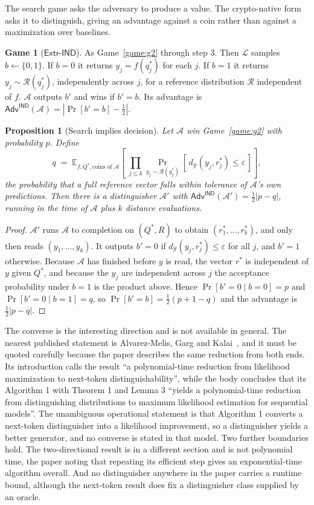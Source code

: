 \documentclass[11pt]{article}
\theoremstyle{definition}
\newtheorem{game}{Game}
\theoremstyle{plain}
\newtheorem{proposition}{Proposition}
\newcommand{\Adv}{\mathsf{Adv}}
\newcommand{\A}{\mathcal{A}}
\newcommand{\Lrn}{\mathcal{L}}
\newcommand{\Y}{\mathcal{Y}}
\begin{document}
The search game asks the adversary to produce a value. The crypto-native form asks
it to distinguish, giving an advantage against a coin rather than against a
maximization over baselines.

\begin{game}[$\mathsf{Extr}\text{-}\mathsf{IND}$]
\label{game:ind}
As Game~\ref{game:g2} through step 3. Then $\Lrn$ samples $b \leftarrow \{0,1\}$.
If $b = 0$ it returns $y_j = f(q^*_j)$ for each $j$. If $b = 1$ it returns
$y_j \sim \mathcal{R}(q^*_j)$, independently across $j$, for a reference
distribution $\mathcal{R}$ independent of $f$. $\A$ outputs $b'$ and wins if
$b' = b$. Its advantage is $\Adv^{\mathsf{IND}}(\A) = |\Pr[b'=b] - \tfrac12|$.
\end{game}

\begin{proposition}[Search implies decision]
\label{prop:s2d}
Let $\A$ win Game~\ref{game:g2} with probability $p$. Define
\[
q \;=\; \mathbb{E}_{f, Q^*, \text{coins of } \A}
\left[\; \prod_{j \le k}
\Pr_{y_j \sim \mathcal{R}(q^*_j)}\!\left[\, d_\Y(y_j, r^*_j) \le \varepsilon \,\right]
\right],
\]
the probability that a full reference vector falls within tolerance of $\A$'s own
predictions. Then there is a distinguisher $\A'$ with
$\Adv^{\mathsf{IND}}(\A') = \tfrac12|p - q|$, running in the time of $\A$ plus $k$
distance evaluations.
\end{proposition}

\begin{proof}
$\A'$ runs $\A$ to completion on $(Q^*, R)$ to obtain $(r^*_1,\dots,r^*_k)$, and
only then reads $(y_1,\dots,y_k)$. It outputs $b'=0$ if $d_\Y(y_j, r^*_j) \le
\varepsilon$ for all $j$, and $b'=1$ otherwise. Because $\A$ has finished before
$y$ is read, the vector $r^*$ is independent of $y$ given $Q^*$, and because the
$y_j$ are independent across $j$ the acceptance probability under $b=1$ is the
product above. Hence $\Pr[b'=0 \mid b=0] = p$ and $\Pr[b'=0 \mid b=1] = q$, so
$\Pr[b'=b] = \tfrac12(p + 1 - q)$ and the advantage is $\tfrac12|p-q|$.
\end{proof}

The converse is the interesting direction and is not available in general. The
nearest published statement is Alvarez-Melis, Garg and Kalai~\cite{AGK22}, and it
must be quoted carefully because the paper describes the same reduction from both
ends. Its introduction calls the result ``a polynomial-time reduction from
likelihood maximization to next-token distinguishability'', while the body
concludes that its Algorithm 1 with Theorem 1 and Lemma 3 ``yields a
polynomial-time reduction from distinguishing distributions to maximum likelihood
estimation for sequential models''. The unambiguous operational statement is that
Algorithm 1 converts a next-token distinguisher into a likelihood improvement, so a
distinguisher yields a better generator, and no converse is stated in that model.
Two further boundaries hold. The two-directional result is in a different section
and is not polynomial time, the paper noting that repeating its efficient step
gives an exponential-time algorithm overall. And no distinguisher anywhere in the
paper carries a runtime bound, although the next-token result does fix a
distinguisher class supplied by an oracle.
\end{document}
